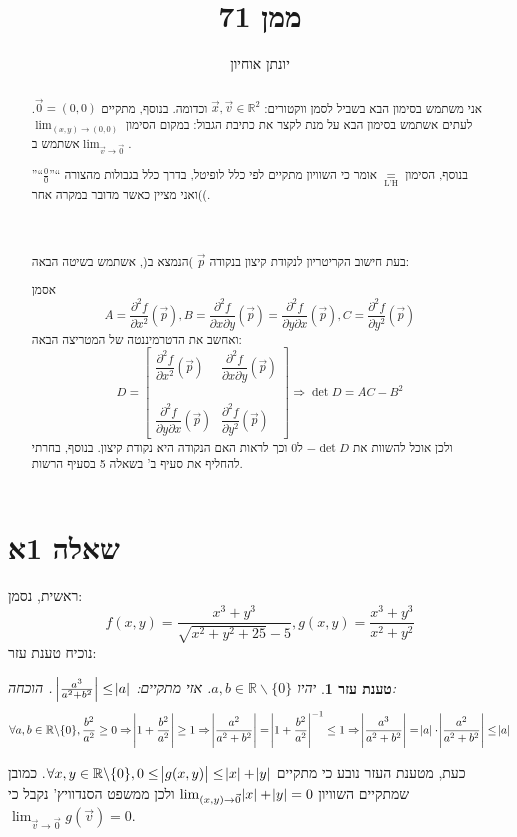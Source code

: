 \documentclass[11pt, oneside]{article}
\title{ממן 71}
\author{יונתן אוחיון}
\newcommand{\br}{\\\\\\\\}
\newcommand{\logr}[1]{\Rightarrow}
\newcommand{\ueq}[1]{\underset{\text{#1}}{=}}
\newcommand{\mR}{\mathbb{R}}
\newcommand{\m}[3]{\R{משפט #3#2.#1}}
\newcommand{\pdt}[3]{\dfrac{\partial^{2} #1}{\partial #2 \partial #3}}
\newcommand{\pdn}[3]{\dfrac{\partial^{#3} #1}{\partial #2^{#3}}}
\newtheorem{lemma}{טענת עזר}
\begin{document}
\maketitle
\renewcommand{\abstractname}{סימונים כלליים וסעיפי רשות}
\begin{abstract}
אני משתמש בסימון הבא בשביל לסמן ווקטורים: $\vec{x}, \vec{v} \in \mR^{2}$ וכדומה. בנוסף, מתקיים $\vec{0} = (0, 0)$. לעתים אשתמש בסימון הבא על מנת לקצר את כתיבת הגבול: במקום הסימון $\lim_{(x, y) \to (0, 0)}$ אשתמש ב$\lim_{\vec{v} \to \vec{0}}$.

בנוסף, הסימון $\ueq{L'H}$ אומר כי השוויון מתקיים לפי כלל לופיטל, בדרך כלל בגבולות מהצורה ``''$\frac{0}{0}$``'' )ואני מציין כאשר מדובר במקרה אחר(.\br

בעת חישוב הקריטריון לנקודת קיצון בנקודה $\vec{p}$ )הנמצא ב\m{7}{27}{}(, אשתמש בשיטה הבאה:

אסמן
\[
A = \pdn{f}{x}{2}(\vec{p}), B = \pdt{f}{x}{y}(\vec{p}) = \pdt{f}{y}{x}(\vec{p}), C = \pdn{f}{y}{2}(\vec{p})
\]
ואחשב את הדטרמיננטה של המטריצה הבאה:
\[
D = \begin{bmatrix}
\pdn{f}{x}{2}(\vec{p}) & \pdt{f}{x}{y}(\vec{p})\br
\pdt{f}{y}{x}(\vec{p}) & \pdn{f}{y}{2}(\vec{p})
\end{bmatrix}
\logr{}
\det{D} = AC - B^{2}
\]
ולכן אוכל להשוות את $-\det{D}$ ל0 וכך לראות האם הנקודה היא נקודת קיצון. בנוסף, בחרתי להחליף את סעיף ב' בשאלה 5 בסעיף הרשות.
\end{abstract}
\clearpage

\section*{שאלה 1א}
ראשית, נסמן:
\[
f(x, y) = \frac{x^{3} + y^{3}}{\sqrt{x^{2} + y^{2} + 25} - 5},
g(x, y) = \frac{x^{3} + y^{3}}{x^{2} + y^{2}}
\]
נוכיח טענת עזר:
\begin{lemma}
יהיו $a, b \in \mR\backslash\{0\}$. אזי מתקיים: $\abs{\frac{a^{3}}{a^{2} + b^{2}}} \le \abs{a}$ . הוכחה:
\[
\forall a, b \in \mR\backslash\{0\},
\frac{b^{2}}{a^{2}} \ge 0 \logr{}
\abs{1 + \frac{b^{2}}{a^{2}}} \ge 1 \logr{} \abs{\frac{a^{2}}{a^{2} + b^{2}}} = \abs{1 + \frac{b^{2}}{a^{2}}}^{-1} \le 1 \logr{} \abs{\frac{a^{3}}{a^{2} + b^{2}}} = \abs{a} \cdot \abs{\frac{a^{2}}{a^{2} + b^{2}}} \le \abs{a}
\]
\end{lemma}
כעת, מטענת העזר נובע כי מתקיים $\forall x, y \in \mR\backslash\{0\}, 0 \le \abs{g(x, y)} \le \abs{x} + \abs{y}$. כמובן שמתקיים השוויון $\lim_{(x, y) \to \vec{0}} \abs{x} + \abs{y} = 0$ ולכן ממשפט הסנדוויץ' נקבל כי $\lim_{\vec{v} \to \vec{0}} g(\vec{v}) = 0$.
\end{document}
